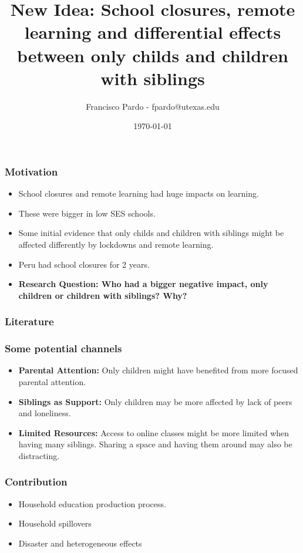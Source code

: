 \documentclass{beamer}
\title[]{New Idea: School closures, remote learning and differential effects between only childs and children with siblings}
\author[Francisco Pardo] %
{Francisco Pardo - fpardo@utexas.edu \inst{1}}
\institute[UT] %
{
  \inst{1}%
  University of Texas at Austin
}
\date{\today}
\begin{document}
\frame{\titlepage}



\begin{frame}
   \frametitle{Motivation}
   \begin{itemize}
       \item School closures and remote learning had huge impacts on learning. 
       \item These were bigger in low SES schools.
       \item Some initial evidence that only childs and children with siblings might be affected differently by lockdowns and remote learning.
       \item Peru had school closures for 2 years.
       \item \textbf{Research Question: Who had a bigger negative impact, only children or children with siblings? Why?}
   \end{itemize}
\end{frame}


\begin{frame}
    \label{mccrary}
    \frametitle{Literature}
        {
  }  
\end{frame}

\begin{frame}
    \frametitle{Some potential channels}
    \begin{itemize}
        \item \textbf{Parental Attention:} Only children might have benefited from more focused parental attention.
        \item \textbf{Siblings as Support:} Only children may be more affected by lack of peers and loneliness.
        \item \textbf{Limited Resources:} Access to online classes might be more limited when having many siblings. Sharing a space and having them around may also be distracting.
    \end{itemize}
\end{frame}

\begin{frame}
    \frametitle{Contribution}
    \begin{itemize}
        \item Household education production process.
        \item Household spillovers
        \item Disaster and heterogeneous effects
    \end{itemize}
\end{frame}
\end{document}
